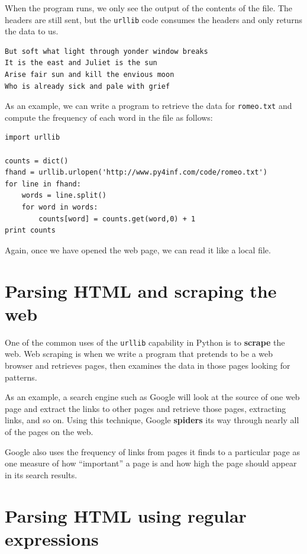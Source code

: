 When the program runs, we only see the output
of the contents of the file.   The headers
are still sent, but the {\tt urllib} code
consumes the headers and only returns the 
data to us.

\beforeverb
\begin{verbatim}
But soft what light through yonder window breaks
It is the east and Juliet is the sun
Arise fair sun and kill the envious moon
Who is already sick and pale with grief
\end{verbatim}
\afterverb
%

As an example, we can write 
a program to retrieve the data for
{\tt romeo.txt} and compute the frequency
of each word in the file as follows:

\beforeverb
\begin{verbatim}
import urllib

counts = dict()
fhand = urllib.urlopen('http://www.py4inf.com/code/romeo.txt')
for line in fhand:
    words = line.split()
    for word in words:
        counts[word] = counts.get(word,0) + 1   
print counts
\end{verbatim}
\afterverb
%
Again, once we have opened the web page, 
we can read it like a local file.

\section{Parsing HTML and scraping the web}

One of the common uses of the {\tt urllib} capability in Python is 
to {\bf scrape} the web.   Web scraping is when we write a program
that pretends to be a web browser and retrieves pages, then 
examines the data in those pages looking for patterns.

As an example, a search engine such as Google will look at the source 
of one web page and extract the links to other pages and retrieve
those pages, extracting links, and so on.   Using this technique,
Google {\bf spiders} its way through nearly all of the pages on 
the web.   

Google also uses the frequency of links from pages it finds 
to a particular page as one measure of how ``important'' 
a page is and how high the page should appear in its search results.

\section{Parsing HTML using regular expressions}


